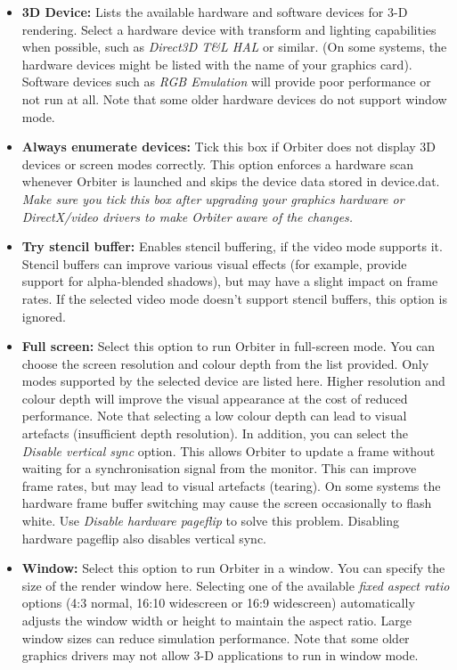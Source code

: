 \documentclass[Orbiter User Manual.tex]{subfiles}
\begin{document}
\noindent

\begin{itemize}
\item \textbf{3D Device:} Lists the available hardware and software devices for 3-D rendering. Select a hardware device with transform and lighting capabilities when possible, such as \textit{Direct3D T\&L HAL} or similar. (On some systems, the hardware devices might be listed with the name of your graphics card). Software devices such as \textit{RGB Emulation} will provide poor performance or not run at all. Note that some older hardware devices do not support window mode.
\item \textbf{Always enumerate devices:} Tick this box if Orbiter does not display 3D devices or screen modes correctly. This option enforces a hardware scan whenever Orbiter is launched and skips the device data stored in device.dat. \textit{Make sure you tick this box after upgrading your graphics hardware or DirectX/video drivers to make Orbiter aware of the changes.}
\item \textbf{Try stencil buffer:} Enables stencil buffering, if the video mode supports it. Stencil buffers can improve various visual effects (for example, provide support for alpha-blended shadows), but may have a slight impact on frame rates. If the selected video mode doesn’t support stencil buffers, this option is ignored.
\item \textbf{Full screen:} Select this option to run Orbiter in full-screen mode. You can choose the screen resolution and colour depth from the list provided. Only modes supported by the selected device are listed here. Higher resolution and colour depth will improve the visual appearance at the cost of reduced performance. Note that selecting a low colour depth can lead to visual artefacts (insufficient depth resolution).\newline
In addition, you can select the \textit{Disable vertical sync} option. This allows Orbiter to update a frame without waiting for a synchronisation signal from the monitor. This can improve frame rates, but may lead to visual artefacts (tearing).\newline
On some systems the hardware frame buffer switching may cause the screen occasionally to flash white. Use \textit{Disable hardware pageflip} to solve this problem. Disabling hardware pageflip also disables vertical sync.
\item \textbf{Window:} Select this option to run Orbiter in a window. You can specify the size of the render window here. Selecting one of the available \textit{fixed aspect ratio} options (4:3 normal, 16:10 widescreen or 16:9 widescreen) automatically adjusts the window width or height to maintain the aspect ratio. Large window sizes can reduce simulation performance. Note that some older graphics drivers may not allow 3-D applications to run in window mode.
\end{itemize}
\end{document}
